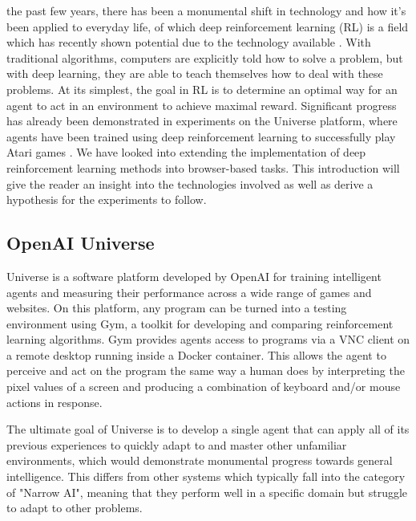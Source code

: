 \documentclass[10pt,journal,compsoc]{IEEEtran}
\begin{document}
% 
% 
% 
% 
 the past few years, there has been a monumental shift in technology and how it's been applied to everyday life, of which deep reinforcement learning (RL) is a field which has recently shown potential due to the technology available \cite{li2017deep}. With traditional algorithms, computers are explicitly told how to solve a problem, but with deep learning, they are able to teach themselves how to deal with these problems. At its simplest, the goal in RL is to determine an optimal way for an agent to act in an environment to achieve maximal reward. Significant progress has already been demonstrated in experiments on the Universe platform, where agents have been trained using deep reinforcement learning to successfully play Atari games \cite{deepqlearning}\cite{mnih2015human}. We have looked into extending the implementation of deep reinforcement learning methods into browser-based tasks. This introduction will give the reader an insight into the technologies involved as well as derive a hypothesis for the experiments to follow.

\subsection{OpenAI Universe}
Universe is a software platform developed by OpenAI for training intelligent agents and measuring their performance across a wide range of games and websites. On this platform, any program can be turned into a testing environment using Gym, a toolkit for developing and comparing reinforcement learning algorithms. Gym provides agents access to programs via a VNC client on a remote desktop running inside a Docker container. This allows the agent to perceive and act on the program the same way a human does by interpreting the pixel values of a screen and producing a combination of keyboard and/or mouse actions in response.

The ultimate goal of Universe is to develop a single agent that can apply all of its previous experiences to quickly adapt to and master other unfamiliar environments, which would demonstrate monumental progress towards general intelligence. This differs from other systems which typically fall into the category of "Narrow AI", meaning that they perform well in a specific domain but struggle to adapt to other problems.
\end{document}
